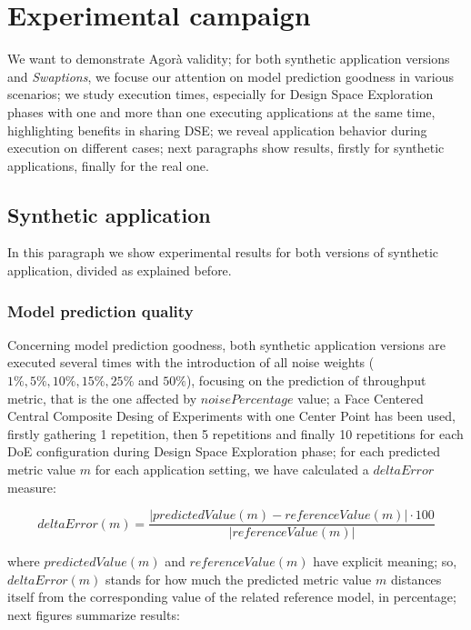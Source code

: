 \section{Experimental campaign}\label{campaign}

We want to demonstrate Agorà validity; for both synthetic application versions and \textit{Swaptions}, we focuse our attention on model prediction goodness in various scenarios; we study execution times, especially for Design Space Exploration phases with one and more than one executing applications at the same time, highlighting benefits in sharing DSE; we reveal application behavior during execution on different cases; next paragraphs show results, firstly for synthetic applications, finally for the real one.


\subsection{Synthetic application}

In this paragraph we show experimental results for both versions of synthetic application, divided as explained before.


\subsubsection{Model prediction quality}\label{deltaErrorExplanation}

Concerning model prediction goodness, both synthetic application versions are executed several times with the introduction of all noise weights ($1\%, 5\%, 10\%, 15\%, 25\%$ and $50\%$), focusing on the prediction of throughput metric, that is the one affected by $noisePercentage$ value; a Face Centered Central Composite Desing of Experiments with one Center Point has been used, firstly gathering 1 repetition, then 5 repetitions and finally 10 repetitions for each DoE configuration during Design Space Exploration phase; for each predicted metric value $m$ for each application setting, we have calculated a $deltaError$ measure:

\[
deltaError(m) = \dfrac{\left\vert predictedValue(m) - referenceValue(m) \right\vert \cdot 100}{\left\vert referenceValue(m) \right\vert}
\]

where $predictedValue(m)$ and $referenceValue(m)$ have explicit meaning; so, $deltaError(m)$ stands for how much the predicted metric value $m$ distances itself from the corresponding value of the related reference model, in percentage; next figures summarize results:





